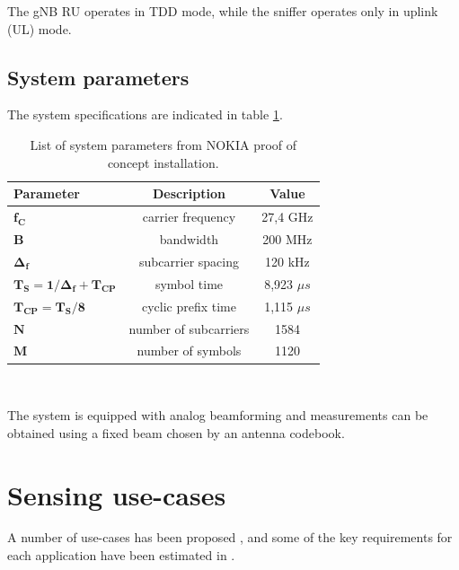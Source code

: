 	The gNB RU operates in TDD mode, while the sniffer operates only in uplink (UL) mode.
	
	\subsection{System parameters}
	
	The system specifications are indicated in table \ref{table:PoCparams}.
	
	\begin{table}[H]
		\centering 
		\begin{tabular}{|p{9em} c c |}
			\hline
			\rowcolor{bluepoli!40} %
			\textbf{Parameter} & \textbf{Description} & \textbf{Value}  \T\B \\
			\hline \hline
			$\bm{f_C}$ & carrier frequency & 27,4 GHz \T\B \\
			$\bm{B}$ & bandwidth & 200 MHz \T\B\\
			$\bm{\Delta_f}$ & subcarrier spacing & 120 kHz  \T\B\\
			$\bm{T_S = 1/\Delta_f + T_{CP}}$ & symbol time & 8,923 $\mu s$  \T\B\\
			$\bm{T_{CP} = T_S/8}$ & cyclic prefix time & 1,115 $\mu s$  \T\B\\
			$\bm{N}$ & number of subcarriers & 1584  \T\B\\
			$\bm{M}$ & number of symbols & 1120  \B\\
			
			\hline
		\end{tabular}
		\\[10pt]
		\caption{List of system parameters from NOKIA proof of concept installation.}
		\label{table:PoCparams}
	\end{table}
	
	The system is equipped with analog beamforming and measurements can be obtained using a fixed beam chosen by an antenna codebook.


\section{Sensing use-cases}

	A number of use-cases has been proposed \cite{Mandelli_Henninger_Bauhofer_Wild_2023}, \cite{Wang_Varshney_Gentile_Blandino_Chuang_Golmie_2022} and some of the  key requirements for each application have been estimated in \cite{Wild_Braun_Viswanathan_2021}.
	
